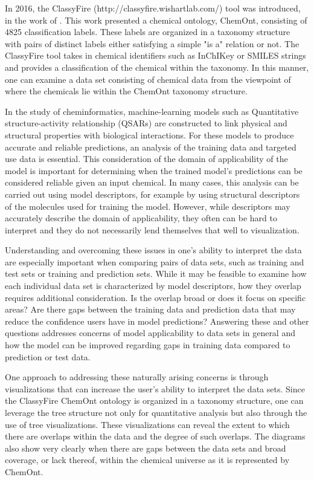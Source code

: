 \documentclass[article]{jss}
\begin{document}
In 2016, the ClassyFire (http://classyfire.wishartlab.com/) tool was introduced, in the work of \cite{djoumbou2016classyfire}. This work presented a chemical ontology, ChemOnt, consisting of 4825 classification labels. These labels are organized in a taxonomy structure with pairs of distinct labels either satisfying a simple "is a" relation or not. The ClassyFire tool takes in chemical identifiers such as InChIKey or SMILES strings and provides a classification of the chemical within the taxonomy. In this manner, one can examine a data set consisting of chemical data from the viewpoint of where the chemicals lie within the ChemOnt taxonomy structure.

In the study of cheminformatics, machine-learning models such as Quantitative structure-activity relationship (QSARs) are constructed to link physical and structural properties with biological interactions. For these models to produce accurate and reliable predictions, an analysis of the training data and targeted use data is essential. This consideration of the domain of applicability of the model is important for determining when the trained model’s predictions can be considered reliable given an input chemical. In many cases, this analysis can be carried out using model descriptors, for example by using structural descriptors of the molecules used for training the model. However, while descriptors may accurately describe the domain of applicability, they often can be hard to interpret and they do not necessarily lend themselves that well to visualization.

Understanding and overcoming these issues in one’s ability to interpret the data are especially important when comparing pairs of data sets, such as training and test sets or training and prediction sets. While it may be feasible to examine how each individual data set is characterized by model descriptors, how they overlap requires additional consideration. Is the overlap broad or does it focus on specific areas? Are there gaps between the training data and prediction data that may reduce the confidence users have in model predictions? Answering these and other questions addresses concerns of model applicability to data sets in general and how the model can be improved regarding gaps in training data compared to prediction or test data.

One approach to addressing these naturally arising concerns is through visualizations that can increase the user’s ability to interpret the data sets. Since the ClassyFire ChemOnt ontology is organized in a taxonomy structure, one can leverage the tree structure not only for quantitative analysis but also through the use of tree visualizations. These visualizations can reveal the extent to which there are overlaps within the data and the degree of such overlaps. The diagrams also show very clearly when there are gaps between the data sets and broad coverage, or lack thereof, within the chemical universe as it is represented by ChemOnt.
\end{document}
